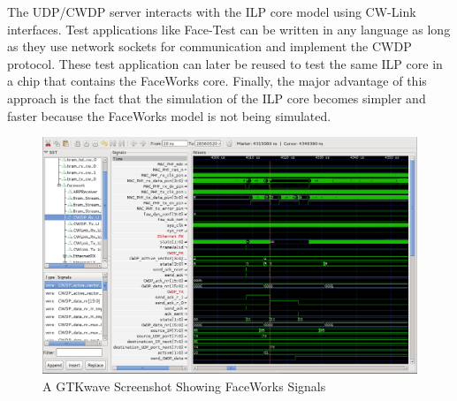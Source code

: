 \documentclass[defaultstyle,10pt,master,Helvetica]{thesis}
\begin{document}
The UDP/CWDP server interacts with the \ac{ILP} core model using CW-Link interfaces. Test applications like Face-Test can be written in any language as long as they use network sockets for communication and implement the \ac{CWDP} protocol. These test application can later be reused to test the same \ac{ILP} core in a chip that contains the FaceWorks core. Finally, the major advantage of this approach is the fact that the simulation of the \ac{ILP} core becomes simpler and faster because the FaceWorks model is not being simulated.

\cleardoublepage


 
 
%
% 

\cleardoublepage

\appendix
\label{Appendix A}
\begin{figure}[t]
  \centering
      \includegraphics[scale=0.50,angle =-90 ]{Diagrams/GTKwave.png}
  \caption{A GTKwave Screenshot Showing FaceWorks Signals}
\end{figure}
\end{document}
